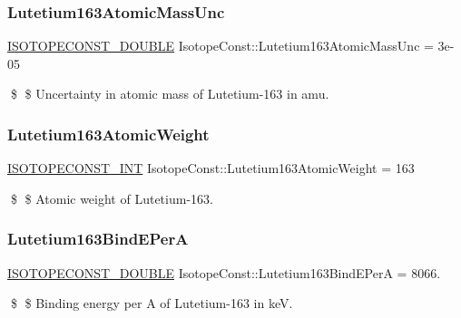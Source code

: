 \subsubsection{\texorpdfstring{Lutetium163\+Atomic\+Mass\+Unc}{Lutetium163AtomicMassUnc}}
{\footnotesize\ttfamily \mbox{\hyperlink{group___isotope_const-_macros_ga8f45a7272ce02c0b4c65c44636ed719a}{I\+S\+O\+T\+O\+P\+E\+C\+O\+N\+S\+T\+\_\+\+D\+O\+U\+B\+LE}} Isotope\+Const\+::\+Lutetium163\+Atomic\+Mass\+Unc = 3e-\/05}

\$ \$ Uncertainty in atomic mass of Lutetium-\/163 in amu. \mbox{\label{group___isotope_const-_lutetium-_lu163_gac9ed302ccd4efd9a7464c14fed2f21e7}} 
\subsubsection{\texorpdfstring{Lutetium163\+Atomic\+Weight}{Lutetium163AtomicWeight}}
{\footnotesize\ttfamily \mbox{\hyperlink{group___isotope_const-_macros_ga5f18360b3e99483a35c32d789e62621c}{I\+S\+O\+T\+O\+P\+E\+C\+O\+N\+S\+T\+\_\+\+I\+NT}} Isotope\+Const\+::\+Lutetium163\+Atomic\+Weight = 163}

\$ \$ Atomic weight of Lutetium-\/163. \mbox{\label{group___isotope_const-_lutetium-_lu163_ga255c490632e2b02491a960ba7b43b167}} 
\subsubsection{\texorpdfstring{Lutetium163\+Bind\+E\+PerA}{Lutetium163BindEPerA}}
{\footnotesize\ttfamily \mbox{\hyperlink{group___isotope_const-_macros_ga8f45a7272ce02c0b4c65c44636ed719a}{I\+S\+O\+T\+O\+P\+E\+C\+O\+N\+S\+T\+\_\+\+D\+O\+U\+B\+LE}} Isotope\+Const\+::\+Lutetium163\+Bind\+E\+PerA = 8066.}

\$ \$ Binding energy per A of Lutetium-\/163 in keV. \mbox{\label{group___isotope_const-_lutetium-_lu163_ga910d01a2ce91c0ed61751c299855698e}} 
